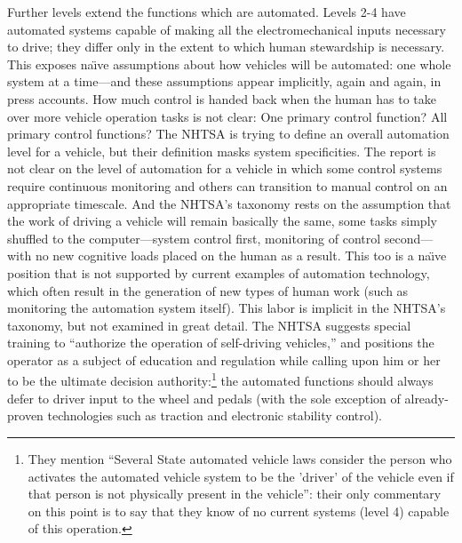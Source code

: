 Further levels extend the functions which are automated. Levels 2-4
have automated systems capable of making all the electromechanical
inputs necessary to drive; they differ only in the extent to which
human stewardship is necessary.\cite[p. 4--5]{NHTSA} This exposes na\"{\i}ve assumptions about
how vehicles will be automated:  one whole system at a time---and
these assumptions appear implicitly, again and again, in press
accounts. How much
control is handed back when the human has to take over more vehicle
operation tasks is not clear: One primary control function? All
primary control functions? The NHTSA is trying to define an overall
automation level for a vehicle, but their definition masks system
specificities. The report is not clear on the level of automation for
a vehicle in which some control systems require continuous monitoring
and others can transition to manual control on an appropriate
timescale. And the NHTSA's taxonomy rests on the assumption that the
work of driving a vehicle will remain basically the same, some tasks
simply shuffled to the computer---system control first, monitoring of
control second---with no new cognitive loads placed on the human as a
result. This too is a na\"{\i}ve position that is not supported by current
examples of automation technology, which often result in the
generation of new types of human work (such as monitoring the
automation system itself). This labor is implicit in the NHTSA's
taxonomy, but not examined in great detail. The NHTSA suggests special
training to ``authorize the operation of self-driving
vehicles,''\cite[p. 11]{NHTSA} and
positions the operator as a subject of education and regulation while
calling upon him or her to be the ultimate decision
authority:\footnote{They mention ``Several State automated vehicle laws
consider the person who activates the automated vehicle system to be
the 'driver' of the vehicle even if that person is not physically
present in the vehicle'': their only commentary on this point is to say
that they know of no current systems (level 4) capable of this
operation.\cite[p. 5]{NHTSA}} the
automated functions should always defer to driver input to the wheel
and pedals (with the sole exception of already-proven technologies
such as traction and electronic stability control).\cite[p. 13]{NHTSA}


